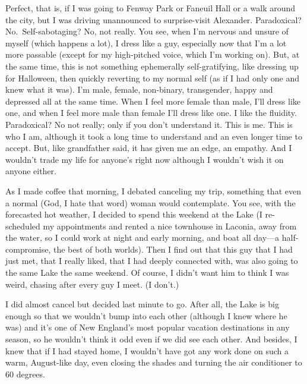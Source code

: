 Perfect, that is, if I was going to Fenway Park or Faneuil Hall or a
walk around the city, but I was driving unannounced to surprise-visit
Alexander. Paradoxical? No.~Self-sabotaging? No, not really. You see,
when I'm nervous and unsure of myself (which happens a lot), I dress
like a guy, especially now that I'm a lot more passable (except for my
high-pitched voice, which I'm working on). But, at the same time, this
is not something ephemerally self-gratifying, like dressing up for
Halloween, then quickly reverting to my normal self (as if I had only
one and knew what it was). I'm male, female, non-binary, transgender,
happy and depressed all at the same time. When I feel more female than
male, I'll dress like one, and when I feel more male than female I'll
dress like one. I like the fluidity. Paradoxical? No not really; only if
you don't understand it. This is me. This is who I am, although it took
a long time to understand and an even longer time to accept. But, like
grandfather said, it has given me an edge, an empathy. And I wouldn't
trade my life for anyone's right now although I wouldn't wish it on
anyone either.

As I made coffee that morning, I debated canceling my trip, something
that even a normal (God, I hate that word) woman would contemplate. You
see, with the forecasted hot weather, I decided to spend this weekend at
the Lake (I re-scheduled my appointments and rented a nice townhouse in
Laconia, away from the water, so I could work at night and early
morning, and boat all day---a half-compromise, the best of both worlds).
Then I find out that this guy that I had just met, that I really liked,
that I had deeply connected with, was also going to the same Lake the
same weekend. Of course, I didn't want him to think I was weird, chasing
after every guy I meet. (I don't.)

I did almost cancel but decided last minute to go. After all, the Lake
is big enough so that we wouldn't bump into each other (although I knew
where he was) and it's one of New England's most popular vacation
destinations in any season, so he wouldn't think it odd even if we did
see each other. And besides, I knew that if I had stayed home, I
wouldn't have got any work done on such a warm, August-like day, even
closing the shades and turning the air conditioner to 60 degrees.

